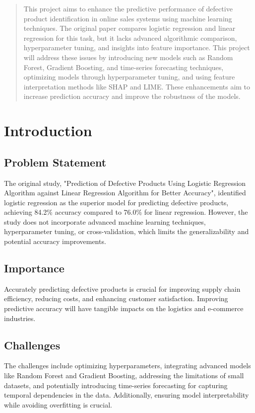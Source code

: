 \documentclass[conference]{IEEEtran}
\begin{document}
\maketitle

\begin{abstract}
This project aims to enhance the predictive performance of defective product identification in online sales systems using machine learning techniques. The original paper compares logistic regression and linear regression for this task, but it lacks advanced algorithmic comparison, hyperparameter tuning, and insights into feature importance. This project will address these issues by introducing new models such as Random Forest, Gradient Boosting, and time-series forecasting techniques, optimizing models through hyperparameter tuning, and using feature interpretation methods like SHAP and LIME. These enhancements aim to increase prediction accuracy and improve the robustness of the models.
\end{abstract}


\section{Introduction}
\subsection{Problem Statement}
The original study, "Prediction of Defective Products Using Logistic Regression Algorithm against Linear Regression Algorithm for Better Accuracy", identified logistic regression as the superior model for predicting defective products, achieving 84.2\% accuracy compared to 76.0\% for linear regression. However, the study does not incorporate advanced machine learning techniques, hyperparameter tuning, or cross-validation, which limits the generalizability and potential accuracy improvements.
\subsection{Importance}
Accurately predicting defective products is crucial for improving supply chain efficiency, reducing costs, and enhancing customer satisfaction. Improving predictive accuracy will have tangible impacts on the logistics and e-commerce industries.
\subsection{Challenges}
The challenges include optimizing hyperparameters, integrating advanced models like Random Forest and Gradient Boosting, addressing the limitations of small datasets, and potentially introducing time-series forecasting for capturing temporal dependencies in the data. Additionally, ensuring model interpretability while avoiding overfitting is crucial.
\end{document}

